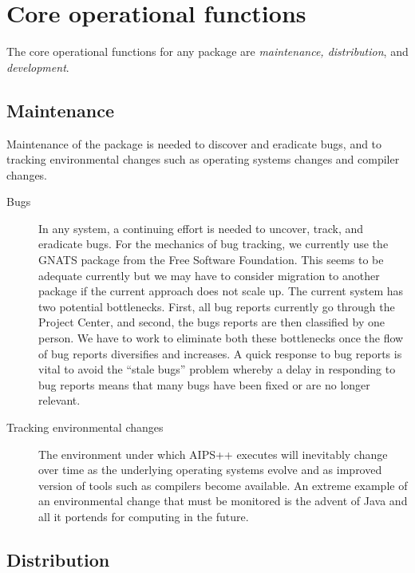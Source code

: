 \section{Core operational functions}

The core operational functions for any package are {\em maintenance,
distribution}, and {\em development}.

\subsection{Maintenance}

Maintenance of the package is needed to discover and eradicate bugs, and
to tracking environmental changes such as operating systems changes
and compiler changes.
\begin{description}
\item[Bugs] In any system, a continuing effort is needed to uncover,
track, and eradicate bugs. For the mechanics of bug tracking, we
currently use the GNATS package from the Free Software
Foundation. This seems to be adequate currently but we may have to
consider migration to another package if the current approach does not
scale up.  The current system has two potential bottlenecks. First,
all bug reports currently go through the Project Center, and second,
the bugs reports are then classified by one person. We have to work to
eliminate both these bottlenecks once the flow of bug reports
diversifies and increases. A quick response to bug reports is vital to
avoid the ``stale bugs'' problem whereby a delay in responding to bug
reports means that many bugs have been fixed or are no longer
relevant.
\item[Tracking environmental changes] The environment under which AIPS++
executes will inevitably change over time as the underlying operating
systems evolve and as improved version of tools such as compilers
become available. An extreme example of an environmental change
that must be monitored is the advent of Java and all it portends
for computing in the future.
\end{description}

\subsection{Distribution}

